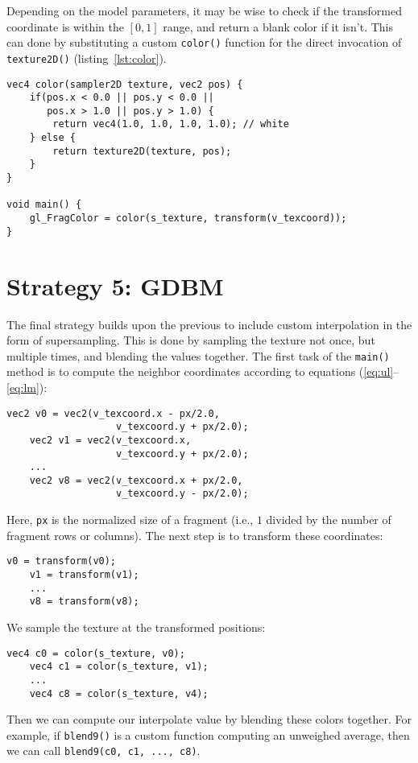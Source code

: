 \documentclass[english,12pt]{ifimaster}
\begin{document}
Depending on the model parameters, it may be wise to check if the
transformed coordinate is within the $[0, 1]$ range, and return a
blank color if it isn't. This can done by substituting a custom
\lstinline|color()| function for the direct invocation of
\lstinline|texture2D()| (listing~\ref{lst:color}).

\begin{lstlisting}[frame=lines,label=lst:color,caption=Texture sampling function]
vec4 color(sampler2D texture, vec2 pos) {
    if(pos.x < 0.0 || pos.y < 0.0 ||
       pos.x > 1.0 || pos.y > 1.0) {
        return vec4(1.0, 1.0, 1.0, 1.0); // white
    } else {
        return texture2D(texture, pos);
    }
}

void main() {
    gl_FragColor = color(s_texture, transform(v_texcoord));
}
\end{lstlisting}

\section{Strategy 5: GDBM}
\label{sec:implementationgdbm}

The final strategy builds upon the previous to include custom
interpolation in the form of supersampling. This is done by sampling
the texture not once, but multiple times, and blending the values
together. The first task of the \lstinline|main()| method is to
compute the neighbor coordinates according to equations
(\ref{eq:ul}--\ref{eq:lm}):
\begin{lstlisting}[frame=lines,label=lst:neighbor,caption=Neighbor coordinates]
    vec2 v0 = vec2(v_texcoord.x - px/2.0,
                   v_texcoord.y + px/2.0);
    vec2 v1 = vec2(v_texcoord.x,
                   v_texcoord.y + px/2.0);
    ...
    vec2 v8 = vec2(v_texcoord.x + px/2.0,
                   v_texcoord.y - px/2.0);
\end{lstlisting}
Here, \lstinline|px| is the normalized size of a fragment (i.e., $1$
divided by the number of fragment rows or columns). The next step is
to transform these coordinates:
\begin{lstlisting}[frame=lines,label=lst:transformed,caption=Transformed coordinates]
    v0 = transform(v0);
    v1 = transform(v1);
    ...
    v8 = transform(v8);
\end{lstlisting}
We sample the texture at the transformed positions:
\begin{lstlisting}[frame=lines,label=lst:sample,caption=Transformed coordinates]
    vec4 c0 = color(s_texture, v0);
    vec4 c1 = color(s_texture, v1);
    ...
    vec4 c8 = color(s_texture, v4);
\end{lstlisting}
Then we can compute our interpolate value by blending these colors
together. For example, if \lstinline|blend9()| is a custom function
computing an unweighed average, then we can call
\lstinline|blend9(c0, c1, ..., c8)|.
\end{document}
